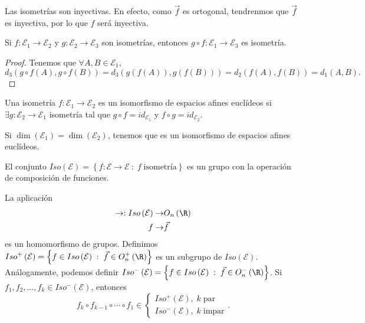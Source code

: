 \begin{observation}
\normalfont Las isometrías son inyectivas. En efecto, como $\displaystyle \vec{f} $ es ortogonal, tendrenmos que $\displaystyle \vec{f} $ es inyectiva, por lo que $\displaystyle f $ será inyectiva.
\end{observation}
\begin{fprop}[]
\normalfont Si $\displaystyle f : \mathcal{E}_{1} \to \mathcal{E}_{2} $ y $\displaystyle g : \mathcal{E}_{2} \to \mathcal{E}_{3} $ son isometrías, entonces $\displaystyle g\circ f : \mathcal{E}_{1} \to \mathcal{E}_{3} $ es isometría. 
\end{fprop}
\begin{proof}
Tenemos que $\displaystyle \forall A,B \in \mathcal{E}_{1} $,
\[d _{3}\left(g\circ f\left(A\right), g\circ f\left(B\right)\right) = d _{3}\left(g\left(f\left(A\right)\right), g\left(f\left(B\right)\right)\right) = d _{2}\left(f\left(A\right), f\left(B\right)\right) = d _{1}\left(A,B\right) .\]
\end{proof}
\begin{fdefinition}[]
\normalfont Una isometría $\displaystyle f : \mathcal{E}_{1} \to \mathcal{E}_{2} $ es un isomorfismo de espacios afines euclídeos si $\displaystyle \exists g : \mathcal{E}_{2} \to \mathcal{E}_{1} $ isometría tal que $\displaystyle g\circ f = id _{\mathcal{E}_{1}} $ y $\displaystyle f \circ g = id _{\mathcal{E}_{2}} $.
\end{fdefinition}
\begin{observation}
\normalfont Si $\displaystyle \dim\left(\mathcal{E}_{1}\right) = \dim\left(\mathcal{E}_{2}\right)$, tenemos que es un isomorfismo de espacios afines euclídeos. 
\end{observation}
\begin{observation}
	\normalfont El conjunto $\displaystyle Iso\left(\mathcal{E}\right) = \left\{ f : \mathcal{E} \to \mathcal{E} \: : \; f \; \text{isometría}\right\}  $ es un grupo con la operación de composición de funciones.
\end{observation}
\begin{observation}
\normalfont La aplicación 
\[
\begin{split}
	\to : Iso\left(\mathcal{E}\right) \to & O_{n}\left(\R\right) \\
	f \to & \vec{f}
\end{split}
\]
es un homomorfismo de grupos. Definimos $\displaystyle Iso ^{+}\left(\mathcal{E}\right) = \left\{ f \in Iso\left(\mathcal{E}\right) \; : \; \vec{f} \in O^{+}_{n}\left(\R\right)\right\}  $ es un subgrupo de $\displaystyle Iso\left(\mathcal{E}\right) $. Análogamente, podemos definir $\displaystyle Iso^{-}\left(\mathcal{E}\right) = \left\{ f \in Iso\left(\mathcal{E}\right)\; : \; \vec{f} \in O^{-}_{n}\left(\R\right)\right\}  $.
Si $\displaystyle f_{1}, f_{2}, \ldots, f_{k} \in Iso^{-}\left(\mathcal{E}\right) $, entonces
\[
f_{k}\circ f_{k-1} \circ \cdots \circ f_{1} \in 
\begin{cases}
	Iso^{+}\left(\mathcal{E}\right), \; k \; \text{par} \\
	Iso^{-}\left(\mathcal{E}\right), \; k \; \text{impar}
\end{cases}
.\]
\end{observation}
